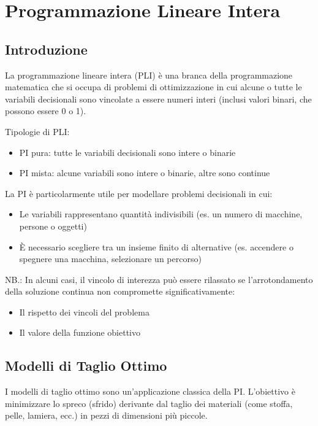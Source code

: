 \section{Programmazione Lineare Intera}

\subsection{Introduzione}
La programmazione lineare intera (PLI) è una branca della programmazione 
matematica che si occupa di problemi di ottimizzazione in cui 
alcune o tutte le variabili decisionali sono vincolate a essere 
numeri interi (inclusi valori binari, che possono essere 0 o 1).

Tipologie di PLI:
\begin{itemize}
    \item PI pura: tutte le variabili decisionali sono intere o binarie
    \item PI mista: alcune variabili sono intere o binarie, altre sono continue
\end{itemize}

La PI è particolarmente utile per modellare problemi decisionali in cui:
\begin{itemize}
    \item Le variabili rappresentano quantità indivisibili (es. un numero di macchine, persone o oggetti)
    \item È necessario scegliere tra un insieme finito di alternative (es. accendere o spegnere una macchina, selezionare un percorso)
\end{itemize}

NB.: In alcuni casi, il vincolo di interezza può essere rilassato se 
l'arrotondamento della soluzione continua non compromette significativamente:
\begin{itemize}
    \item Il rispetto dei vincoli del problema
    \item Il valore della funzione obiettivo
\end{itemize}

\subsection{Modelli di Taglio Ottimo}
I modelli di taglio ottimo sono un'applicazione classica della PI. 
L'obiettivo è minimizzare lo spreco (sfrido) derivante dal taglio dei 
materiali (come stoffa, pelle, lamiera, ecc.) in pezzi di dimensioni più piccole.

